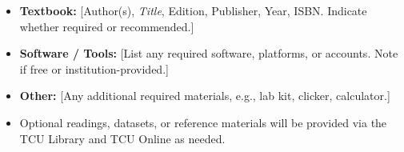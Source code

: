 \begin{itemize}
\item \textbf{Textbook:} [Author(s), \textit{Title}, Edition, Publisher, Year, ISBN. Indicate whether required or recommended.]
\item \textbf{Software / Tools:} [List any required software, platforms, or accounts. Note if free or institution-provided.]
\item \textbf{Other:} [Any additional required materials, e.g., lab kit, clicker, calculator.]
\end{itemize}

\begin{itemize}
\item Optional readings, datasets, or reference materials will be provided via the TCU Library and TCU Online as needed.
\end{itemize}
